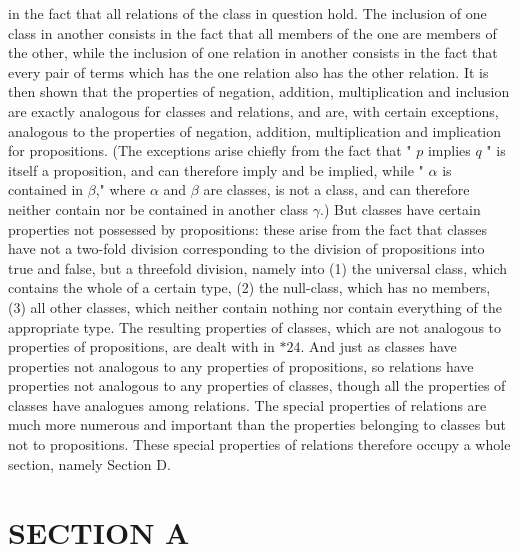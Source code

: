 \documentclass[10pt]{article}
\begin{document}
in the fact that all relations of the class in question hold. The inclusion of one class in another consists in the fact that all members of the one are members of the other, while the inclusion of one relation in another consists in the fact that every pair of terms which has the one relation also has the other relation. It is then shown that the properties of negation, addition, multiplication and inclusion are exactly analogous for classes and relations, and are, with certain exceptions, analogous to the properties of negation, addition, multiplication and implication for propositions. (The exceptions arise chiefly from the fact that " $p$ implies $q$ " is itself a proposition, and can therefore imply and be implied, while " $\alpha$ is contained in $\beta$," where $\alpha$ and $\beta$ are classes, is not a class, and can therefore neither contain nor be contained in another class $\gamma$.) But classes have certain properties not possessed by propositions: these arise from the fact that classes have not a two-fold division corresponding to the division of propositions into true and false, but a threefold division, namely into (1) the universal class, which contains the whole of a certain type, (2) the null-class, which has no members, (3) all other classes, which neither contain nothing nor contain everything of the appropriate type. The resulting properties of classes, which are not analogous to properties of propositions, are dealt with in $* 24$. And just as classes have properties not analogous to any properties of propositions, so relations have properties not analogous to any properties of classes, though all the properties of classes have analogues among relations. The special properties of relations are much more numerous and important than the properties belonging to classes but not to propositions. These special properties of relations therefore occupy a whole section, namely Section D.

\section*{SECTION A}
\end{document}
